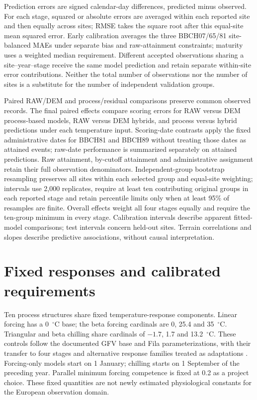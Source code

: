 \documentclass[a4paper,11pt]{article}
\let\OriginalSection\section
\renewcommand{\section}{\FloatBarrier\OriginalSection}
\begin{document}
Prediction errors are signed calendar-day differences, predicted minus
observed. For each stage, squared or absolute errors are averaged within each
reported site and then equally across sites; RMSE takes the square root after
this equal-site mean squared error. Early calibration averages the three BBCH07/65/81 site-balanced MAEs under
separate bias and raw-attainment constraints; maturity uses a weighted median requirement. Different accepted observations sharing a site--year--stage
receive the same model prediction and retain separate within-site error
contributions. Neither the total number of observations nor the number of
sites is a substitute for the number of independent validation groups.

Paired RAW/DEM and process/residual comparisons preserve common observed records. The final paired effects compare scoring errors for RAW versus DEM process-based models, RAW versus DEM hybrids, and process versus hybrid predictions under each temperature input. Scoring-date contrasts apply the fixed administrative dates for BBCH81 and BBCH89 without treating those dates as attained events; raw-date performance is summarized separately on attained predictions. Raw attainment, by-cutoff attainment and administrative assignment retain their full observation denominators. Independent-group bootstrap resampling preserves all sites within each selected group and equal-site weighting; intervals use 2,000 replicates, require at least ten contributing original groups in each reported stage and retain percentile limits only when at least 95\% of resamples are finite. Overall effects weight all four stages equally and require the ten-group minimum in every stage. Calibration intervals describe apparent fitted-model comparisons; test intervals concern held-out sites. Terrain correlations and slopes describe predictive associations, without causal interpretation.

\section{Fixed responses and calibrated requirements}

Ten process structures share fixed temperature-response components. Linear
forcing has a 0~$^{\circ}$C base; the beta forcing cardinals are 0, 25.4 and
35~$^{\circ}$C. Triangular and beta chilling share cardinals of $-1.7$, 1.7
and 13.2~$^{\circ}$C. These controls follow the documented GFV base and Fila
parameterizations, with their transfer to four stages and alternative response
families treated as adaptations \citep{parkerGeneralPhenologicalModel2011a,filaComparisonDifferentModelling2014}.
Forcing-only models start on 1 January; chilling starts on 1 September of the
preceding year. Parallel minimum forcing competence is fixed at 0.2 as a
project choice. These fixed quantities are not newly estimated physiological
constants for the European observation domain.
\end{document}
